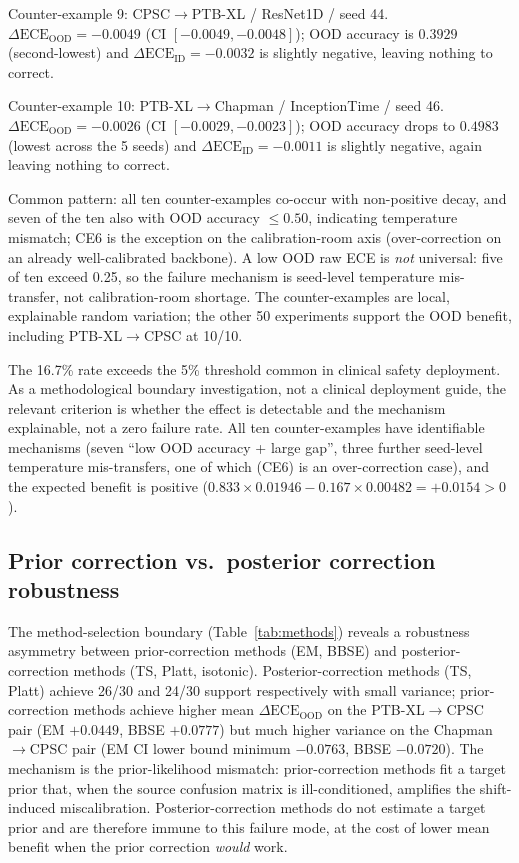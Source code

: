 \documentclass[review,12pt,nonatbib]{elsarticle}
\begin{document}
Counter-example 9: CPSC$\rightarrow$PTB-XL / ResNet1D / seed 44.
$\Delta\text{ECE}_{\text{OOD}}=-0.0049$ (CI $[-0.0049, -0.0048]$); OOD
accuracy is $0.3929$ (second-lowest) and
$\Delta\text{ECE}_{\text{ID}}=-0.0032$ is slightly negative, leaving
nothing to correct.

Counter-example 10: PTB-XL$\rightarrow$Chapman / InceptionTime / seed 46.
$\Delta\text{ECE}_{\text{OOD}}=-0.0026$ (CI $[-0.0029, -0.0023]$); OOD
accuracy drops to $0.4983$ (lowest across the 5 seeds) and
$\Delta\text{ECE}_{\text{ID}}=-0.0011$ is slightly negative, again leaving
nothing to correct.

Common pattern: all ten counter-examples co-occur with non-positive
decay, and seven of the ten also with OOD accuracy $\leq 0.50$,
indicating temperature mismatch; CE6 is the exception on the
calibration-room axis (over-correction on an already well-calibrated
backbone). A low OOD raw ECE is \emph{not} universal: five of ten exceed
0.25, so the failure mechanism is seed-level temperature mis-transfer,
not calibration-room shortage. The counter-examples are local,
explainable random variation; the other 50 experiments support the OOD
benefit, including PTB-XL$\rightarrow$CPSC at 10/10.

The 16.7\% rate exceeds the 5\% threshold common in clinical safety
deployment. As a methodological boundary investigation, not a clinical
deployment guide, the relevant criterion is whether the effect is
detectable and the mechanism explainable, not a zero failure rate. All
ten counter-examples have identifiable mechanisms (seven ``low OOD
accuracy + large gap'', three further seed-level temperature
mis-transfers, one of which (CE6) is an over-correction case), and the
expected benefit is positive
($0.833 \times 0.01946 - 0.167 \times 0.00482 = +0.0154 > 0$).

\subsection{Prior correction vs.\ posterior correction robustness}
The method-selection boundary (Table~\ref{tab:methods}) reveals a
robustness asymmetry between prior-correction methods (EM, BBSE) and
posterior-correction methods (TS, Platt, isotonic). Posterior-correction
methods (TS, Platt) achieve 26/30 and 24/30 support respectively with
small variance; prior-correction methods achieve higher mean
$\Delta\text{ECE}_{\text{OOD}}$ on the PTB-XL$\rightarrow$CPSC pair
(EM $+0.0449$, BBSE $+0.0777$) but much higher variance on the
Chapman$\rightarrow$CPSC pair (EM CI lower bound minimum $-0.0763$,
BBSE $-0.0720$). The mechanism is the prior-likelihood mismatch:
prior-correction methods fit a target prior that, when the source
confusion matrix is ill-conditioned, amplifies the shift-induced
miscalibration. Posterior-correction methods do not estimate a target
prior and are therefore immune to this failure mode, at the cost of
lower mean benefit when the prior correction \emph{would} work.
\end{document}
